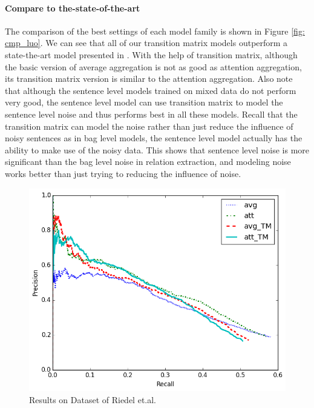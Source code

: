 \paragraph{Compare to the-state-of-the-art} 
The comparison of the best settings of each model family is shown in Figure \ref{fig: cmp_luo}. We can see that all of our transition matrix models outperform a state-the-art model presented in \cite{luo2016temporal}. With the help of transition matrix, although the basic version of average aggregation is not as good as attention aggregation, its transition matrix version is similar to the attention aggregation. Also note that although the sentence level models trained on mixed data do not perform very good, the sentence level model can use transition matrix to model the sentence level noise and thus performs best in all these models. Recall that the transition matrix can model the noise rather than just reduce the influence of noisy sentences as in bag level models, the sentence level model actually has the ability to make use of the noisy data. This shows that sentence level noise is more significant than the bag level noise in relation extraction, and modeling noise works better than just trying to reducing the influence of noise.


\begin{figure}[t!]
\includegraphics[width=0.9\linewidth]{figures/re_att_avg_cmp_exp.png}
\caption{Results on Dataset of Riedel et.al.}
\label{fig: Riedel_res}
\end{figure}

